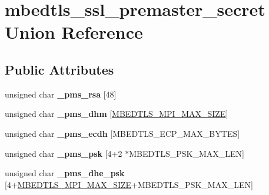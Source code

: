 \hypertarget{unionmbedtls__ssl__premaster__secret}{\section{mbedtls\-\_\-ssl\-\_\-premaster\-\_\-secret Union Reference}
\label{unionmbedtls__ssl__premaster__secret}
}
\subsection*{Public Attributes}
\begin{DoxyCompactItemize}
\item 
\hypertarget{unionmbedtls__ssl__premaster__secret_aa81cb4c88b891c552a5382460eb32f94}{unsigned char {\bfseries \-\_\-pms\-\_\-rsa} \mbox{[}48\mbox{]}}\label{unionmbedtls__ssl__premaster__secret_aa81cb4c88b891c552a5382460eb32f94}

\item 
\hypertarget{unionmbedtls__ssl__premaster__secret_a4d40cce21beb555ce7c4064bf330237c}{unsigned char {\bfseries \-\_\-pms\-\_\-dhm} \mbox{[}\hyperlink{bignum_8h_a02bfffc46b7b2e10c0080d29bb56e6b0}{M\-B\-E\-D\-T\-L\-S\-\_\-\-M\-P\-I\-\_\-\-M\-A\-X\-\_\-\-S\-I\-Z\-E}\mbox{]}}\label{unionmbedtls__ssl__premaster__secret_a4d40cce21beb555ce7c4064bf330237c}

\item 
\hypertarget{unionmbedtls__ssl__premaster__secret_af35264f678322dccd349d3486fa3645e}{unsigned char {\bfseries \-\_\-pms\-\_\-ecdh} \mbox{[}M\-B\-E\-D\-T\-L\-S\-\_\-\-E\-C\-P\-\_\-\-M\-A\-X\-\_\-\-B\-Y\-T\-E\-S\mbox{]}}\label{unionmbedtls__ssl__premaster__secret_af35264f678322dccd349d3486fa3645e}

\item 
\hypertarget{unionmbedtls__ssl__premaster__secret_a61b5f1e012670e08b564867e2a5aa84b}{unsigned char {\bfseries \-\_\-pms\-\_\-psk} \mbox{[}4+2 $\ast$M\-B\-E\-D\-T\-L\-S\-\_\-\-P\-S\-K\-\_\-\-M\-A\-X\-\_\-\-L\-E\-N\mbox{]}}\label{unionmbedtls__ssl__premaster__secret_a61b5f1e012670e08b564867e2a5aa84b}

\item 
\hypertarget{unionmbedtls__ssl__premaster__secret_ad3ec56031a020dfc72ca356eadb4cc9a}{unsigned char {\bfseries \-\_\-pms\-\_\-dhe\-\_\-psk} \mbox{[}4+\hyperlink{bignum_8h_a02bfffc46b7b2e10c0080d29bb56e6b0}{M\-B\-E\-D\-T\-L\-S\-\_\-\-M\-P\-I\-\_\-\-M\-A\-X\-\_\-\-S\-I\-Z\-E}+M\-B\-E\-D\-T\-L\-S\-\_\-\-P\-S\-K\-\_\-\-M\-A\-X\-\_\-\-L\-E\-N\mbox{]}}\label{unionmbedtls__ssl__premaster__secret_ad3ec56031a020dfc72ca356eadb4cc9a}


\end{DoxyCompactItemize}
